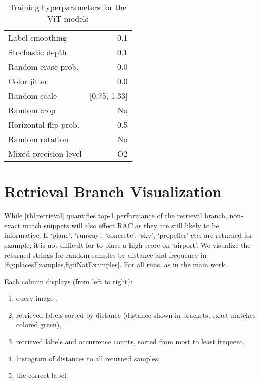 \documentclass[10pt,twocolumn,letterpaper]{article}
\begin{document}
{\begin{table}
\begin{tabular}{@{}lr@{}}
		Label smoothing             & 0.1            \\
		Stochastic depth            & 0.1            \\
		Random erase prob.          & 0.0           \\
		Color jitter                & 0.0            \\
		Random scale                & {[}0.75, 1.33{]} \\
		Random crop                 & No             \\
		Horizontal flip prob.       & 0.5   \\
		Random rotation             & No             \\
		Mixed precision level       & O2             \\ \bottomrule
	\end{tabular}
\caption{Training hyperparameters for the ViT models}
\label{tbl:vithyperparams}
\end{table}




\section{Retrieval Branch Visualization}\label{apx:vis}
While \cref{tbl:retrieval} quantifies top-1 performance of the retrieval branch, non-exact match snippets will also effect RAC as they are still likely to be informative. If `plane', `runway', `concrete', `sky', `propeller' etc. are returned for example, it is not difficult for  to place a high score on `airport'. We visualize the returned strings for random samples by distance and frequency in \cref{fig:placesExamples,fig:iNatExamples}. For all runs,  as in the main work. 

Each column displays (from left to right):
\begin{enumerate}
\itemsep -0.0861cm
    \item 
 query image ,
 \item retrieved labels sorted by distance (distance shown in brackets, exact matches colored green),
 \item 
 retrieved labels and occurrence counts, sorted from most to least frequent,
 \item  histogram of distances to all returned samples,
 \item  the correct label. 

\end{enumerate}



}
\end{document}
